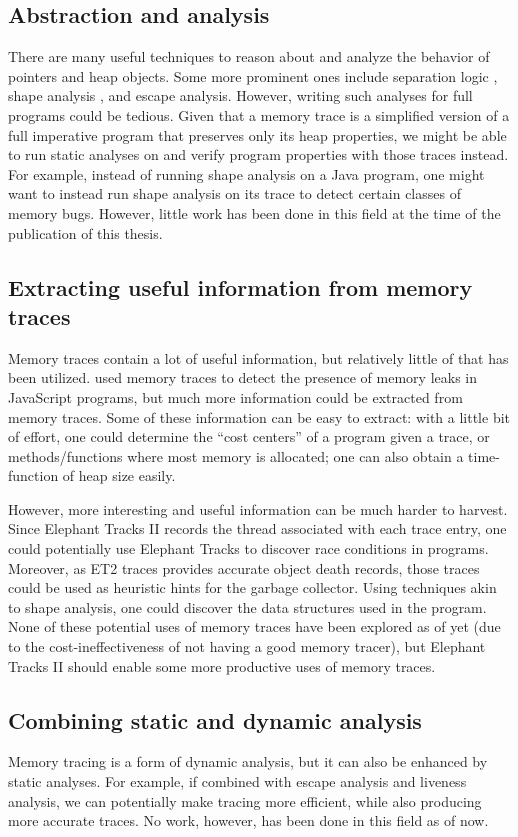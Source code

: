 \subsection{Abstraction and analysis}
There are many useful techniques to reason about and analyze the behavior of pointers and heap objects. Some more prominent ones include separation
logic \citep{SeparationLogic}, shape analysis \citep{ShapeAnalysis}, and escape analysis. However, writing such analyses for full programs could be
tedious. Given that a memory trace is a simplified version of a full imperative program that preserves only its heap properties, we might be able to
run static analyses on and verify program properties with those traces instead. For example, instead of running shape analysis on a Java program, one
might want to instead run shape analysis on its trace to detect certain classes of memory bugs. However, little work has been done in this field at the
time of the publication of this thesis.

\subsection{Extracting useful information from memory traces}
Memory traces contain a lot of useful information, but relatively little of that has been utilized. \cite{MemInsight} used memory traces to detect the
presence of memory leaks in JavaScript programs, but much more information could be extracted from memory traces. Some of these information can be easy
to extract: with a little bit of effort, one could determine the ``cost centers'' of a program given a trace, or methods/functions where most memory is
allocated; one can also obtain a time-function of heap size easily.

However, more interesting and useful information can be much harder to harvest. Since Elephant Tracks II records the thread associated with each trace
entry, one could potentially use Elephant Tracks to discover race conditions in programs. Moreover, as ET2 traces provides accurate object death
records, those traces could be used as heuristic hints for the garbage collector. Using techniques akin to shape analysis, one could discover the
data structures used in the program. None of these potential uses of memory traces have been explored as of yet (due to the cost-ineffectiveness of not
having a good memory tracer), but Elephant Tracks II should enable some more productive uses of memory traces.

\subsection{Combining static and dynamic analysis}
Memory tracing is a form of dynamic analysis, but it can also be enhanced by static analyses. For example, if combined with escape analysis and liveness
analysis, we can potentially make tracing more efficient, while also producing more accurate traces. No work, however, has been done in this
field as of now.

